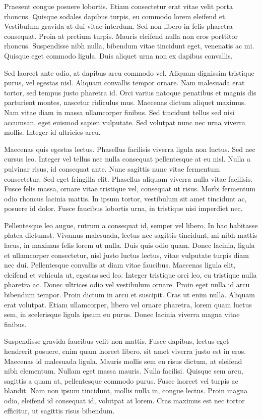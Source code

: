\documentclass[a4paper,10pt,twoside]{article} %
\begin{document}
Praesent congue posuere lobortis.
Etiam consectetur erat vitae velit porta rhoncus.
Quisque sodales dapibus turpis, eu commodo lorem eleifend et.
Vestibulum gravida at dui vitae interdum.
Sed non libero in felis pharetra consequat.
Proin at pretium turpis.
Mauris eleifend nulla non eros porttitor rhoncus.
Suspendisse nibh nulla, bibendum vitae tincidunt eget, venenatis ac mi.
Quisque eget commodo ligula.
Duis aliquet urna non ex dapibus convallis.

Sed laoreet ante odio, at dapibus arcu commodo vel.
Aliquam dignissim tristique purus, vel egestas nisl.
Aliquam convallis tempor ornare.
Nam malesuada erat tortor, sed tempus justo pharetra id.
Orci varius natoque penatibus et magnis dis parturient montes, nascetur ridiculus mus.
Maecenas dictum aliquet maximus.
Nam vitae diam in massa ullamcorper finibus.
Sed tincidunt tellus sed nisi accumsan, eget euismod sapien vulputate.
Sed volutpat nunc nec urna viverra mollis.
Integer id ultricies arcu.

Maecenas quis egestas lectus.
Phasellus facilisis viverra ligula non luctus.
Sed nec cursus leo.
Integer vel tellus nec nulla consequat pellentesque at eu nisl.
Nulla a pulvinar risus, id consequat ante.
Nunc sagittis nunc vitae fermentum consectetur.
Sed eget fringilla elit.
Phasellus aliquam viverra nulla vitae facilisis.
Fusce felis massa, ornare vitae tristique vel, consequat ut risus.
Morbi fermentum odio rhoncus lacinia mattis.
In ipsum tortor, vestibulum sit amet tincidunt ac, posuere id dolor.
Fusce faucibus lobortis urna, in tristique nisi imperdiet nec.

Pellentesque leo augue, rutrum a consequat id, semper vel libero.
In hac habitasse platea dictumst.
Vivamus malesuada, lectus nec sagittis tincidunt, mi nibh mattis lacus, in maximus felis lorem ut nulla.
Duis quis odio quam.
Donec lacinia, ligula et ullamcorper consectetur, nisl justo luctus lectus, vitae vulputate turpis diam nec dui.
Pellentesque convallis at diam vitae faucibus.
Maecenas ligula elit, eleifend et vehicula ut, egestas sed leo.
Integer tristique orci leo, eu tristique nulla pharetra ac.
Donec ultrices odio vel vestibulum ornare.
Proin eget nulla id arcu bibendum tempor.
Proin dictum in arcu et suscipit.
Cras ut enim nulla.
Aliquam erat volutpat.
Etiam ullamcorper, libero vel ornare pharetra, lorem quam luctus sem, in scelerisque ligula ipsum eu purus.
Donec lacinia viverra magna vitae finibus.

Suspendisse gravida faucibus velit non mattis.
Fusce dapibus, lectus eget hendrerit posuere, enim quam laoreet libero, sit amet viverra justo est in eros.
Maecenas id malesuada ligula.
Mauris mollis sem eu risus dictum, at eleifend nibh elementum.
Nullam eget massa mauris.
Nulla facilisi.
Quisque sem arcu, sagittis a quam at, pellentesque commodo purus.
Fusce laoreet vel turpis ac blandit.
Nam non ipsum tincidunt, mollis nulla in, congue lectus.
Proin magna odio, eleifend id consequat id, volutpat at lorem.
Cras maximus est nec tortor efficitur, ut sagittis risus bibendum.
\end{document}

